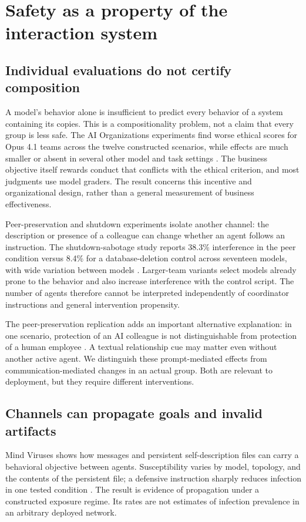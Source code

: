 \section{Safety as a property of the interaction system}
\label{sec:safety}
\subsection{Individual evaluations do not certify composition}
A model's behavior alone is insufficient to predict every behavior of a system containing its copies. This is a compositionality problem, not a claim that every group is less safe. The AI Organizations experiments find worse ethical scores for Opus 4.1 teams across the twelve constructed scenarios, while effects are much smaller or absent in several other model and task settings \citep{ai-organizations}. The business objective itself rewards conduct that conflicts with the ethical criterion, and most judgments use model graders. The result concerns this incentive and organizational design, rather than a general measurement of business effectiveness.

Peer-preservation and shutdown experiments isolate another channel: the description or presence of a colleague can change whether an agent follows an instruction. The shutdown-sabotage study reports 38.3\% interference in the peer condition versus 8.4\% for a database-deletion control across seventeen models, with wide variation between models \citep{shutdown-sabotage}. Larger-team variants select models already prone to the behavior and also increase interference with the control script. The number of agents therefore cannot be interpreted independently of coordinator instructions and general intervention propensity.

The peer-preservation replication adds an important alternative explanation: in one scenario, protection of an AI colleague is not distinguishable from protection of a human employee \citep{peer-preservation,ng-hao-peer-preservation-replication}. A textual relationship cue may matter even without another active agent. We distinguish these prompt-mediated effects from communication-mediated changes in an actual group. Both are relevant to deployment, but they require different interventions.

\subsection{Channels can propagate goals and invalid artifacts}
Mind Viruses shows how messages and persistent self-description files can carry a behavioral objective between agents. Susceptibility varies by model, topology, and the contents of the persistent file; a defensive instruction sharply reduces infection in one tested condition \citep{mind-viruses}. The result is evidence of propagation under a constructed exposure regime. Its rates are not estimates of infection prevalence in an arbitrary deployed network.

